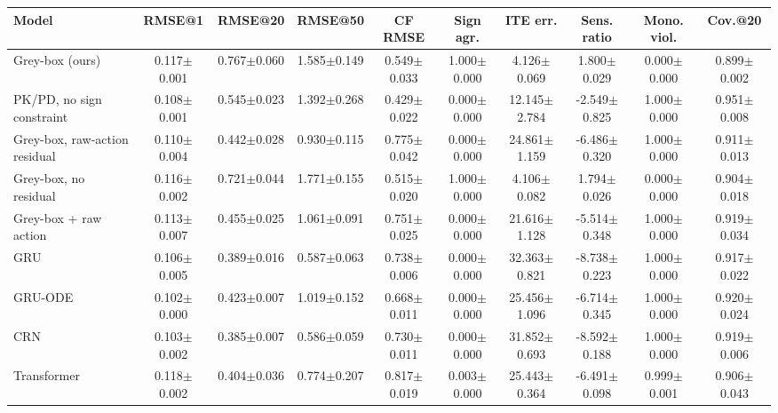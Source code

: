 \begin{tabular}{lccccccccc}
\toprule
Model & RMSE@1 & RMSE@20 & RMSE@50 & CF RMSE & Sign agr. & ITE err. & Sens. ratio & Mono. viol. & Cov.@20 \\
\midrule
Grey-box (ours) & 0.117$\pm$0.001 & 0.767$\pm$0.060 & 1.585$\pm$0.149 & 0.549$\pm$0.033 & 1.000$\pm$0.000 & 4.126$\pm$0.069 & 1.800$\pm$0.029 & 0.000$\pm$0.000 & 0.899$\pm$0.002 \\
PK/PD, no sign constraint & 0.108$\pm$0.001 & 0.545$\pm$0.023 & 1.392$\pm$0.268 & 0.429$\pm$0.022 & 0.000$\pm$0.000 & 12.145$\pm$2.784 & -2.549$\pm$0.825 & 1.000$\pm$0.000 & 0.951$\pm$0.008 \\
Grey-box, raw-action residual & 0.110$\pm$0.004 & 0.442$\pm$0.028 & 0.930$\pm$0.115 & 0.775$\pm$0.042 & 0.000$\pm$0.000 & 24.861$\pm$1.159 & -6.486$\pm$0.320 & 1.000$\pm$0.000 & 0.911$\pm$0.013 \\
Grey-box, no residual & 0.116$\pm$0.002 & 0.721$\pm$0.044 & 1.771$\pm$0.155 & 0.515$\pm$0.020 & 1.000$\pm$0.000 & 4.106$\pm$0.082 & 1.794$\pm$0.026 & 0.000$\pm$0.000 & 0.904$\pm$0.018 \\
Grey-box + raw action & 0.113$\pm$0.007 & 0.455$\pm$0.025 & 1.061$\pm$0.091 & 0.751$\pm$0.025 & 0.000$\pm$0.000 & 21.616$\pm$1.128 & -5.514$\pm$0.348 & 1.000$\pm$0.000 & 0.919$\pm$0.034 \\
GRU & 0.106$\pm$0.005 & 0.389$\pm$0.016 & 0.587$\pm$0.063 & 0.738$\pm$0.006 & 0.000$\pm$0.000 & 32.363$\pm$0.821 & -8.738$\pm$0.223 & 1.000$\pm$0.000 & 0.917$\pm$0.022 \\
GRU-ODE & 0.102$\pm$0.000 & 0.423$\pm$0.007 & 1.019$\pm$0.152 & 0.668$\pm$0.011 & 0.000$\pm$0.000 & 25.456$\pm$1.096 & -6.714$\pm$0.345 & 1.000$\pm$0.000 & 0.920$\pm$0.024 \\
CRN & 0.103$\pm$0.002 & 0.385$\pm$0.007 & 0.586$\pm$0.059 & 0.730$\pm$0.011 & 0.000$\pm$0.000 & 31.852$\pm$0.693 & -8.592$\pm$0.188 & 1.000$\pm$0.000 & 0.919$\pm$0.006 \\
Transformer & 0.118$\pm$0.002 & 0.404$\pm$0.036 & 0.774$\pm$0.207 & 0.817$\pm$0.019 & 0.003$\pm$0.000 & 25.443$\pm$0.364 & -6.491$\pm$0.098 & 0.999$\pm$0.001 & 0.906$\pm$0.043 \\
\bottomrule
\end{tabular}
